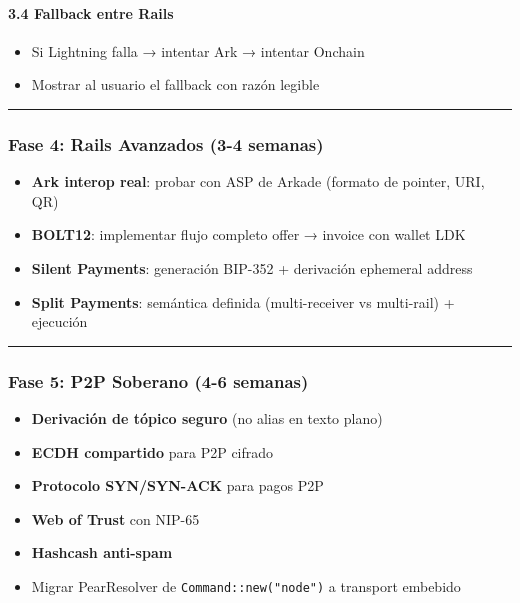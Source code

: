 \documentclass[
]{article}
\providecommand{\tightlist}{%
  \setlength{\itemsep}{0pt}\setlength{\parskip}{0pt}}
\begin{document}
\hypertarget{fallback-entre-rails}{%
\paragraph{3.4 Fallback entre Rails}\label{fallback-entre-rails}}

\begin{itemize}
\tightlist
\item[$\square$]
  Si Lightning falla → intentar Ark → intentar Onchain
\item[$\square$]
  Mostrar al usuario el fallback con razón legible
\end{itemize}

\begin{center}\rule{0.5\linewidth}{0.5pt}\end{center}

\hypertarget{fase-4-rails-avanzados-3-4-semanas}{%
\subsubsection{Fase 4: Rails Avanzados (3-4
semanas)}\label{fase-4-rails-avanzados-3-4-semanas}}

\begin{itemize}
\tightlist
\item[$\square$]
  \textbf{Ark interop real}: probar con ASP de Arkade (formato de
  pointer, URI, QR)
\item[$\square$]
  \textbf{BOLT12}: implementar flujo completo offer → invoice con wallet
  LDK
\item[$\square$]
  \textbf{Silent Payments}: generación BIP-352 + derivación ephemeral
  address
\item[$\square$]
  \textbf{Split Payments}: semántica definida (multi-receiver vs
  multi-rail) + ejecución
\end{itemize}

\begin{center}\rule{0.5\linewidth}{0.5pt}\end{center}

\hypertarget{fase-5-p2p-soberano-4-6-semanas}{%
\subsubsection{Fase 5: P2P Soberano (4-6
semanas)}\label{fase-5-p2p-soberano-4-6-semanas}}

\begin{itemize}
\tightlist
\item[$\square$]
  \textbf{Derivación de tópico seguro} (no alias en texto plano)
\item[$\square$]
  \textbf{ECDH compartido} para P2P cifrado
\item[$\square$]
  \textbf{Protocolo SYN/SYN-ACK} para pagos P2P
\item[$\square$]
  \textbf{Web of Trust} con NIP-65
\item[$\square$]
  \textbf{Hashcash anti-spam}
\item[$\square$]
  Migrar PearResolver de \texttt{Command::new("node")} a transport
  embebido
\end{itemize}
\end{document}
